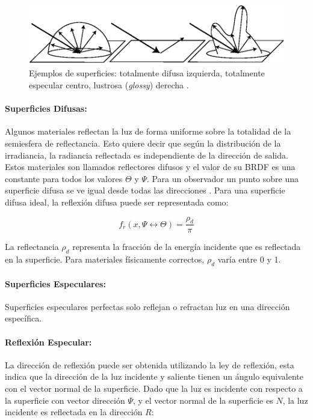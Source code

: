 \begin{figure}[H]
	\centering
	\includegraphics[width=0.85\linewidth]{media/brdfs_types.eps}
	\caption{Ejemplos de superficies: totalmente difusa izquierda, totalmente especular centro, lustrosa (\emph{glossy}) derecha \cite{advanced_gi2006}.}
	\label{fig:brdf_types}
\end{figure}

\paragraph{Superficies Difusas:}
Algunos materiales reflectan la luz de forma uniforme sobre la totalidad de la semiesfera de reflectancia. Esto quiere decir que según la distribución de la irradiancia, la radiancia reflectada es independiente de la dirección de salida. Estos materiales son llamados reflectores difusos y el valor de su \ac{BRDF} es una constante para todos los valores $\Theta$ y $\Psi$. Para un observador un punto sobre una superficie difusa se ve igual desde todas las direcciones \cite{advanced_gi2006}. Para una superficie difusa ideal, la reflexión difusa puede ser representada como:

\begin{equation}
    f_{r}(x, \Psi\leftrightarrow\Theta) = \frac{\rho_{d}}{\pi}
    \label{eq:diffuse_reflection}
\end{equation}

La reflectancia $\rho_{d}$ representa la fracción de la energía incidente que es reflectada en la superficie. Para materiales físicamente correctos, $\rho_{d}$ varía entre 0 y 1.

\paragraph{Superficies Especulares:}
\label{para:speculars}
Superficies especulares perfectas solo reflejan o refractan luz en una dirección específica.
\paragraph{Reflexión Especular:}
La dirección de reflexión puede ser obtenida utilizando la ley de reflexión, esta indica que la dirección de la luz incidente y saliente tienen un ángulo equivalente con el vector normal de la superficie. Dado que la luz es incidente con respecto a la superficie con vector dirección $\Psi$, y el vector normal de la superficie es $N$, la luz incidente es reflectada en la dirección $R$:

